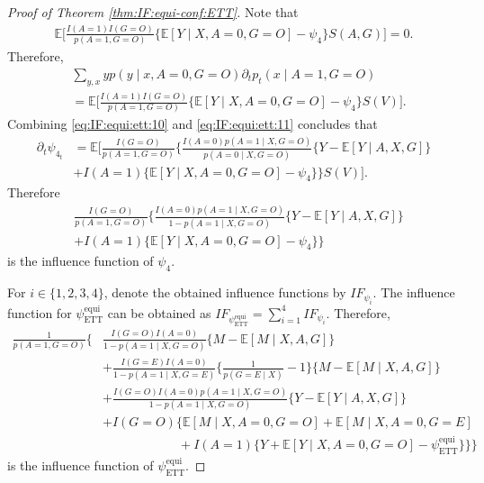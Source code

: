 \documentclass[10pt]{article}
\newcommand{\E}{\mathbb{E}}
\begin{document}
\begin{proof}[Proof of Theorem \ref{thm:IF:equi-conf:ETT}]
Note that
\begin{align*}
\E\Big[\frac{I(A=1)I(G=O)}{p(A=1,G=O)} \{\E[Y\mid X,A=0,G=O]-\psi_4\} S(A,G)\Big]=0.	
\end{align*}
Therefore,
\begin{equation}
\label{eq:IF:equi:ett:11}
\begin{aligned}
&\sum_{y,x} y p(y\mid x,A=0,G=O)\partial_t p_t(x\mid A=1,G=O)\\
&=\E\Big[\frac{I(A=1)I(G=O)}{p(A=1,G=O)} \{\E[Y\mid X,A=0,G=O]-\psi_4\} S(V)\Big].
\end{aligned}
\end{equation}
Combining \eqref{eq:IF:equi:ett:10} and \eqref{eq:IF:equi:ett:11} concludes that
\begin{align*}
\partial_t\psi_{4_t} 
&=\E\Big[
\frac{I(G=O)}{p(A=1,G=O)}
\Big\{
\frac{I(A=0)p(A=1\mid X,G=O)}{p(A=0\mid X,G=O)}\{Y-\E[Y\mid A,X,G]\}\\
&+I(A=1)\{\E[Y\mid X,A=0,G=O]-\psi_4\} 
\Big\}S(V)\Big].	
\end{align*}
Therefore
\begin{align*}
&\frac{I(G=O)}{p(A=1,G=O)}
\Big\{
\frac{I(A=0)p(A=1\mid X,G=O)}{1-p(A=1\mid X,G=O)}\{Y-\E[Y\mid A,X,G]\}\\
&+I(A=1)\{\E[Y\mid X,A=0,G=O]-\psi_4\} 
\Big\}
\end{align*}
is the influence function of $\psi_4$.

For $i\in\{1,2,3,4\}$, denote the obtained influence functions by $IF_{\psi_i}$.
The influence function for $\psi_{\text{ETT}}^{\text{equi}}$ can be obtained as
$IF_{\psi_{\text{ETT}}^{\text{equi}}}=
\sum_{i=1}^4IF_{\psi_i}$. Therefore,
\begin{align*}
\frac{1}{p(A=1,G=O)}\Big\{
&\frac{I(G=O)I(A=0)}{1-p(A=1\mid X,G=O)}\{M-\E[M\mid X,A,G]\}\\
&+\frac{I(G=E)I(A=0)}{1-p(A=1\mid X,G=E)}\{\frac{1}{p(G=E\mid X)}-1\}\{M-\E[M\mid X,A,G]\}\\
&+\frac{I(G=O)I(A=0)p(A=1\mid X,G=O)}{1-p(A=1\mid X,G=O)}\{Y-\E[Y\mid A,X,G]\}\\
&+I(G=O)\big\{
\E[M\mid X,A=0,G=O]
+\E[M\mid X,A=0,G=E]\\
&\qquad\qquad\qquad+I(A=1)\{Y+\E[Y\mid X,A=0,G=O]-\psi_{\text{ETT}}^{\text{equi}}\}\big\}\Big\}
\end{align*}
is the influence function of $\psi_{\text{ETT}}^{\text{equi}}$.


\end{proof}
\end{document}
